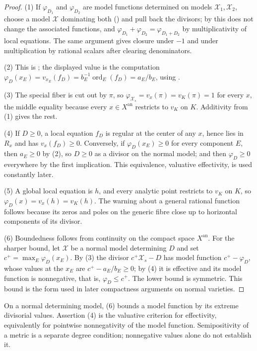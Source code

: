 \begin{proof}
(1) If $\varphi_{D_1}$ and $\varphi_{D_2}$ are model functions determined
on models $\mathcal X_1,\mathcal X_2$, choose a model $\mathcal X$
dominating both () and pull back the divisors;
by  this does not change the
associated functions, and $\varphi_{D_1}+\varphi_{D_2}=\varphi_{D_1+D_2}$
by multiplicativity of local equations. The same argument gives closure
under $-1$ and under multiplication by rational scalars after clearing
denominators.

(2) This is ; the
displayed value is the computation $\varphi_D(x_E)=v_{x_E}(f_D)=
b_E^{-1}\operatorname{ord}_E(f_D)=a_E/b_E$, using
.

(3) The special fiber is cut out by $\pi$, so $\varphi_{\mathcal X_s}
=v_x(\pi)=v_K(\pi)=1$ for every $x$, the middle equality because every
$x\in X^{\mathrm{an}}$ restricts to $v_K$ on $K$. Additivity from (1)
gives the rest.

(4) If $D\ge0$, a local equation $f_D$ is regular at the center of any
$x$, hence lies in $R_x$ and has $v_x(f_D)\ge0$. Conversely, if
$\varphi_D(x_E)\ge0$ for every component $E$, then $a_E\ge0$ by (2),
so $D\ge0$ as a divisor on the normal model; and then $\varphi_D\ge0$
everywhere by the first implication. This equivalence, valuative effectivity,
is used constantly later.

(5) A global local equation is $h$, and every analytic point restricts to
$v_K$ on $K$, so
$\varphi_D(x)=v_x(h)=v_K(h)$.  The warning about a general rational
function follows because its zeros and poles on the generic fibre close up
to horizontal components of its divisor.

(6) Boundedness follows from continuity on the compact space
$X^{\mathrm{an}}$. For the sharper bound, let $\mathcal X$ be a normal
model determining $D$ and set
$c^+=\max_E\varphi_D(x_E)$. By (3) the divisor
$c^+\mathcal X_s-D$ has model function $c^+-\varphi_D$, whose values at
the $x_E$ are $c^+-a_E/b_E\ge0$; by (4) it is effective and its model
function is nonnegative, that is, $\varphi_D\le c^+$. The lower bound is
symmetric. This bound is the form used in later compactness arguments
on normal varieties.
\end{proof}

On a normal determining model, (6) bounds a model function by its extreme
divisorial values. Assertion (4) is the valuative criterion for effectivity,
equivalently for pointwise nonnegativity of the model function.
Semipositivity of a metric is a separate degree condition; nonnegative
values alone do not establish it.

